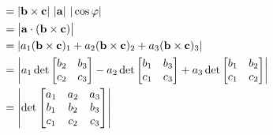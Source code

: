 \begin{eg}
\begin{align*}
&=|\mathbf{b}\times\mathbf{c}|\ |\mathbf{a}|\ |\cos\varphi|\\
&=\big|\mathbf{a}\cdot(\mathbf{b}\times\mathbf{c})\big|\\
&=\left|a_1 (\mathbf{b}\times\mathbf{c})_1 +a_2 (\mathbf{b}\times\mathbf{c})_2 
               +a_3 (\mathbf{b}\times\mathbf{c})_3\right|\\
&=\left|a_1\det\left[\begin{matrix}b_2&b_3\\ c_2&c_3\end{matrix}\right] 
        -a_2 \det\left[\begin{matrix}b_1&b_3\\ c_1&c_3\end{matrix}\right] 
               +a_3\det\left[\begin{matrix}b_1&b_2\\ c_1&c_2\end{matrix}\right]\right|\\
&=\left|\det\left[\begin{matrix}a_1&a_2&a_3\\
                          b_1&b_2&b_3\\
                          c_1&c_2&c_3\end{matrix}\right]\right|
\end{align*}

\end{eg}


